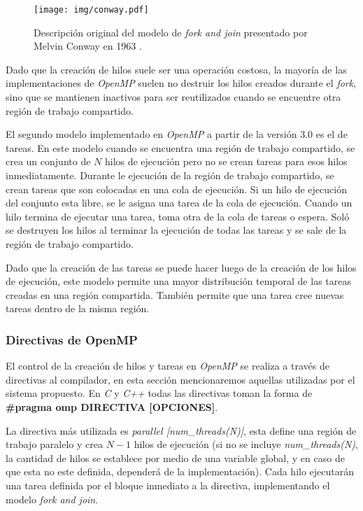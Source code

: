 \begin{figure}[h]

	\centering

	\texttt{[image: img/conway.pdf]}

	\caption{Descripción original del modelo de \emph{fork and join}
	presentado por Melvin Conway en 1963 \cite{conway1963}.}

	\label{conway}

\end{figure}

Dado que la creación de hilos suele ser una operación costosa, la mayoría de las
implementaciones de \emph{OpenMP} suelen no destruir los hilos creados durante
el \emph{fork}, sino que se mantienen inactivos para ser reutilizados cuando se
encuentre otra región de trabajo compartido.

El segundo modelo implementado en \emph{OpenMP} a partir de la versión $3.0$ es
el de tareas. En este modelo cuando se encuentra una región de trabajo
compartido, se crea un conjunto de $N$ hilos de ejecución pero no se crean
tareas para esos hilos inmediatamente. Durante le ejecución de la región de
trabajo compartido, se crean tareas que son colocadas en una cola de ejecución.
Si un hilo de ejecución del conjunto esta libre, se le asigna una tarea de la
cola de ejecución. Cuando un hilo termina de ejecutar una tarea, toma otra de la
cola de tareas o espera. Soló se destruyen los hilos al terminar la ejecución de
todas las tareas y se sale de la región de trabajo compartido.

Dado que la creación de las tareas se puede hacer luego de la creación de los
hilos de ejecución, este modelo permite una mayor distribución temporal de las
tareas creadas en una región compartida. También permite que una tarea cree
nuevas tareas dentro de la misma región.

\subsubsection{Directivas de OpenMP}

El control de la creación de hilos y tareas en \emph{OpenMP} se realiza a través
de directivas al compilador, en esta sección mencionaremos aquellas utilizadas
por el sistema propuesto. En \emph{C} y \emph{C++} todas las directivas toman la
forma de \textbf{\#pragma omp DIRECTIVA [OPCIONES]}.

La directiva más utilizada es \emph{parallel [num\_threads(N)]}, esta define una
región de trabajo paralelo y crea $N-1$ hilos de ejecución (si no se incluye
\emph{num\_threads(N)}, la cantidad de hilos se establece por medio de una
variable global, y en caso de que esta no este definida, dependerá de la
implementación). Cada hilo ejecutarán una tarea definida por el bloque inmediato
a la directiva, implementando el modelo \emph{fork and join}.

